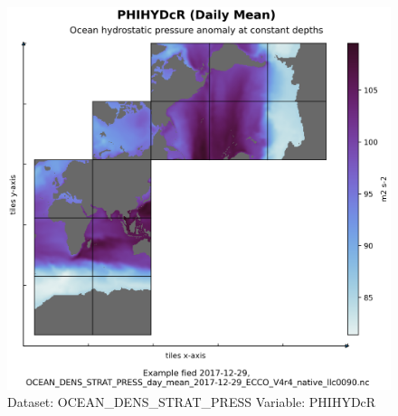 \begin{figure}[H]
\centering
\includegraphics[scale=0.55]{../images/plots/native_plots/Ocean_Density_Stratification_and_Hydrostatic_Pressure/PHIHYDcR.png}
\caption{Dataset: OCEAN\_DENS\_STRAT\_PRESS Variable: PHIHYDcR}
\label{tab:table-OCEAN_DENS_STRAT_PRESS_PHIHYDcR-Plot}
\end{figure}
\pagebreak
